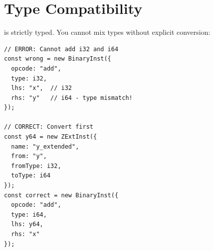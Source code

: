\section{Type Compatibility}

 is strictly typed. You cannot mix types without explicit conversion:

\begin{lstlisting}[style=ts]
// ERROR: Cannot add i32 and i64
const wrong = new BinaryInst({
  opcode: "add",
  type: i32,
  lhs: "x",  // i32
  rhs: "y"   // i64 - type mismatch!
});

// CORRECT: Convert first
const y64 = new ZExtInst({
  name: "y_extended",
  from: "y",
  fromType: i32,
  toType: i64
});
const correct = new BinaryInst({
  opcode: "add",
  type: i64,
  lhs: y64,
  rhs: "x"
});
\end{lstlisting}

